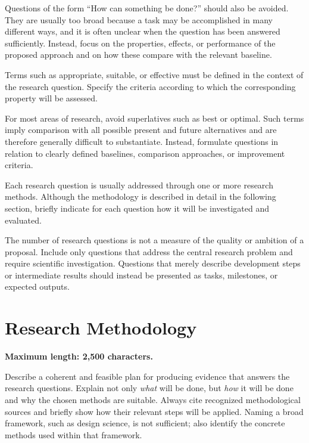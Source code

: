 \documentclass[runningheads]{llncs}
\begin{document}
Questions of the form “How can something be done?” should also be avoided. They are usually too broad because a task may be accomplished in many different ways, and it is often unclear when the question has been answered sufficiently. Instead, focus on the properties, effects, or performance of the proposed approach and on how these compare with the relevant baseline.

Terms such as appropriate, suitable, or effective must be defined in the context of the research question. Specify the criteria according to which the corresponding property will be assessed.

For most areas of research, avoid superlatives such as best or optimal. Such terms imply comparison with all possible present and future alternatives and are therefore generally difficult to substantiate. Instead, formulate questions in relation to clearly defined baselines, comparison approaches, or improvement criteria.

Each research question is usually addressed through one or more research methods. Although the methodology is described in detail in the following section, briefly indicate for each question how it will be investigated and evaluated.

The number of research questions is not a measure of the quality or ambition of a proposal. Include only questions that address the central research problem and require scientific investigation. Questions that merely describe development steps or intermediate results should instead be presented as tasks, milestones, or expected outputs.

\section{Research Methodology}
\textbf{Maximum length: 2,500 characters.}

Describe a coherent and feasible plan for producing evidence that answers the
research questions. Explain not only \emph{what} will be done, but \emph{how} it will be done and why the chosen methods are suitable. Always cite recognized methodological sources and briefly show how their relevant steps will be applied. Naming a broad framework, such as design science, is not sufficient; also identify the concrete methods used within that framework.
\end{document}
